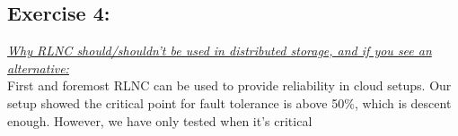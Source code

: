 \subsection{Exercise 4:}
\underline{\textit{Why RLNC should/shouldn't be used in distributed storage, and if you see an alternative:}}\\
First and foremost RLNC can be used to provide reliability in cloud setups. Our setup showed the critical point for
fault tolerance is above 50\%, which is descent enough. 
However, we have only tested when it's critical   

\pagebreak